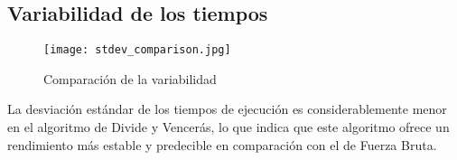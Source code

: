 \documentclass{article}
\begin{document}
\subsection{Variabilidad de los tiempos}

\begin{figure}[H]
\centering
\texttt{[image: stdev\_comparison.jpg]}
\caption{Comparación de la variabilidad}
\end{figure}

La desviación estándar de los tiempos de ejecución es considerablemente menor en el algoritmo de Divide y Vencerás, lo que indica que este algoritmo ofrece un rendimiento más estable y predecible en comparación con el de Fuerza Bruta.


\printbibliography
\end{document}
